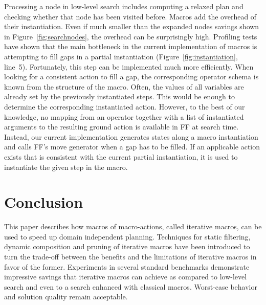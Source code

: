 \documentclass{article}
\begin{document}
Processing a node in low-level search includes computing a relaxed plan
and checking whether that node has been visited before.
Macros add the overhead of their instantiation.
Even if much smaller than the expanded nodes savings shown 
in Figure~\ref{fig:searchnodes},
the overhead can be surprisingly high.
Profiling tests have shown that the main bottleneck in the current
implementation of macros is attempting to fill
gaps in a partial instantiation 
(Figure~\ref{fig:instantiation}, line~5).
Fortunately, this step can be implemented much more efficiently.
When looking for a consistent action to fill a gap,
the corresponding operator schema is known from the structure
of the macro.
Often, the values of all variables are already set by the previously instantiated steps.
This would be enough to determine the corresponding instantiated
action.
However, to the best of our knowledge, no mapping
from an operator together with a list of instantiated arguments to the resulting
ground action is available in {\sc FF} at search time.
Instead, our current implementation generates states along a macro instantiation
and calls {\sc FF}'s move generator when a gap has to be filled.
If an applicable action exists that is consistent with the current partial instantiation,
it is used to instantiate the given step in the macro.


\section{Conclusion}
\label{conclusion}
This paper describes how macros of macro-actions, called iterative macros,
can be used to speed up domain independent planning.
Techniques for static filtering, dynamic composition and pruning of iterative macros
have been introduced to turn the trade-off between the benefits and the limitations
of iterative macros in favor of the former.
Experiments in several standard benchmarks demonstrate 
impressive savings that iterative macros can achieve as compared to
low-level search and even to a search enhanced with classical macros.
Worst-case behavior and solution quality remain acceptable.
\end{document}
